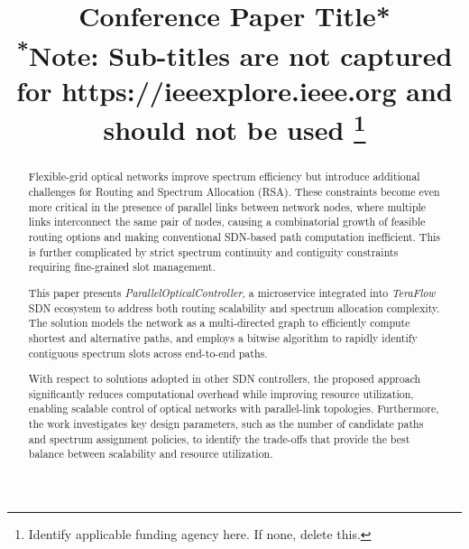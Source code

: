 \documentclass[conference]{IEEEtran}
\begin{document}
\title{Conference Paper Title*\\
{\footnotesize \textsuperscript{*}Note: Sub-titles are not captured for https://ieeexplore.ieee.org  and
should not be used}
\thanks{Identify applicable funding agency here. If none, delete this.}
}

\author{
    \and
    \and
}

\maketitle

\begin{abstract}
    Flexible-grid optical networks improve spectrum efficiency but introduce additional challenges for Routing and Spectrum Allocation (RSA). These constraints become even more critical in the presence of parallel links between network nodes, where multiple links interconnect the same pair of nodes, causing a combinatorial growth of feasible routing options and making conventional SDN-based path computation inefficient. This is further complicated by strict spectrum continuity and contiguity constraints requiring fine-grained slot management.

    This paper presents \emph{ParallelOpticalController}, a microservice integrated into \emph{TeraFlow} SDN ecosystem to address both routing scalability and spectrum allocation complexity. The solution models the network as a multi-directed graph to efficiently compute shortest and alternative paths, and employs a bitwise algorithm to rapidly identify contiguous spectrum slots across end-to-end paths.

    With respect to solutions adopted in other SDN controllers, the proposed approach significantly reduces computational overhead while improving resource utilization, enabling scalable control of optical networks with parallel-link topologies. Furthermore, the work investigates key design parameters, such as the number of candidate paths and spectrum assignment policies, to identify the trade-offs that provide the best balance between scalability and resource utilization.
\end{abstract}
\end{document}
